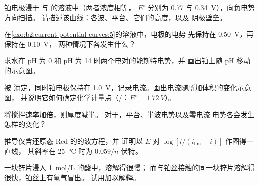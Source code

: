 \begin{exercise}[$\star\star$]\label{exo:b2:current-potential-curves:5}
铂电极浸于  与  的溶液中（两者浓度相等，
$E^\circ$ 分别为 0.77 与 \qty{0.34}{V}），向负电势方向扫描。
请描述该曲线：各波、平台、它们的高度，以及
阴极壁垒。
\end{exercise}

\begin{exercise}[$\star\star$]\label{exo:b2:current-potential-curves:6}
在\cref{exo:b2:current-potential-curves:5}的溶液中，电极的电势
先保持在 \qty{0.50}{V}，再保持在 \qty{0.10}{V}，
两种情况下各发生什么？
\end{exercise}

\begin{exercise}[$\star\star$]\label{exo:b2:current-potential-curves:7}
求水在 pH 为 0 和 pH 为 14 时两个电对的能斯特电势，并
画出铂上随 pH 移动的示意图。
\end{exercise}

\begin{exercise}[$\star\star$]\label{exo:b2:current-potential-curves:8}
 被  滴定，同时铂电极保持在
\qty{1.0}{V}，记录电流。画出电流随所加体积的变化示意图，
并说明它如何确定化学计量点（/：$E^\circ =
\qty{1.72}{V}$）。
\end{exercise}

\begin{exercise}[$\star\star$]\label{exo:b2:current-potential-curves:9}
将搅拌速率加倍，则厚度减半。
对于，平台、半波电势以及零电流
电势各会发生怎样的变化？
\end{exercise}

\begin{exercise}[$\star\star\star$]\label{exo:b2:current-potential-curves:10}
推导仅含还原态 Red 的的波方程，并
证明以 $E$ 对 $\log[i/(i_{\lim} - i)]$ 作图得一直线，
其斜率在 \qty{25}{\degreeCelsius} 时为 $0.059/n$ 伏特。
\end{exercise}

\begin{exercise}[$\star\star\star$]\label{exo:b2:current-potential-curves:11}
一块锌片浸入 \qty{1}{mol/L} 的酸中，溶解得很慢；
而与铂丝接触的同一块锌片溶解得很快，铂丝上有氢气冒出。
试用加以解释。
\end{exercise}

